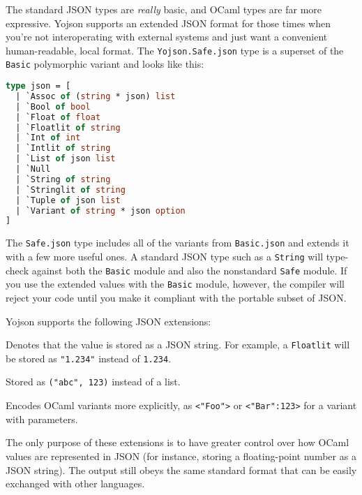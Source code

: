 The standard JSON types are \emph{really} basic, and OCaml types are far
more expressive. Yojson supports an extended JSON format for those times
when you're not interoperating with external systems and just want a
convenient human-readable, local format. The
\passthrough{\lstinline!Yojson.Safe.json!} type is a superset of the
\passthrough{\lstinline!Basic!} polymorphic variant and looks like this:

\begin{lstlisting}[language=Caml]
type json = [
  | `Assoc of (string * json) list
  | `Bool of bool
  | `Float of float
  | `Floatlit of string
  | `Int of int
  | `Intlit of string
  | `List of json list
  | `Null
  | `String of string
  | `Stringlit of string
  | `Tuple of json list
  | `Variant of string * json option
]
\end{lstlisting}

The \passthrough{\lstinline!Safe.json!} type includes all of the
variants from \passthrough{\lstinline!Basic.json!} and extends it with a
few more useful ones. A standard JSON type such as a
\passthrough{\lstinline!String!} will type-check against both the
\passthrough{\lstinline!Basic!} module and also the nonstandard
\passthrough{\lstinline!Safe!} module. If you use the extended values
with the \passthrough{\lstinline!Basic!} module, however, the compiler
will reject your code until you make it compliant with the portable
subset of JSON.

Yojson supports the following JSON extensions:

\begin{description}
\tightlist
\item[The \texttt{lit} suffix]
Denotes that the value is stored as a JSON string. For example, a
\passthrough{\lstinline!Floatlit!} will be stored as
\passthrough{\lstinline!"1.234"!} instead of
\passthrough{\lstinline!1.234!}.
\item[The \texttt{Tuple} type]
Stored as \passthrough{\lstinline!("abc", 123)!} instead of a list.
\item[The \texttt{Variant} type]
Encodes OCaml variants more explicitly, as
\passthrough{\lstinline!<"Foo">!} or
\passthrough{\lstinline!<"Bar":123>!} for a variant with parameters.
\end{description}

The only purpose of these extensions is to have greater control over how
OCaml values are represented in JSON (for instance, storing a
floating-point number as a JSON string). The output still obeys the same
standard format that can be easily exchanged with other languages.

